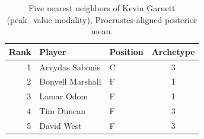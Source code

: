 \begin{table}[htbp]
  \centering\small
  \begin{tabular}{rllc}
    \toprule
    Rank & Player & Position & Archetype \\
    \midrule
    1 & Arvydas Sabonis & C & 3 \\
    2 & Donyell Marshall & F & 1 \\
    3 & Lamar Odom & F & 1 \\
    4 & Tim Duncan & F & 3 \\
    5 & David West & F & 3 \\
    \bottomrule
  \end{tabular}
  \caption{Five nearest neighbors of Kevin Garnett (peak_value modality), Procrustes-aligned posterior mean.}
  \label{tab:Kevin_Garnett_neighbors_peak_value}
\end{table}

